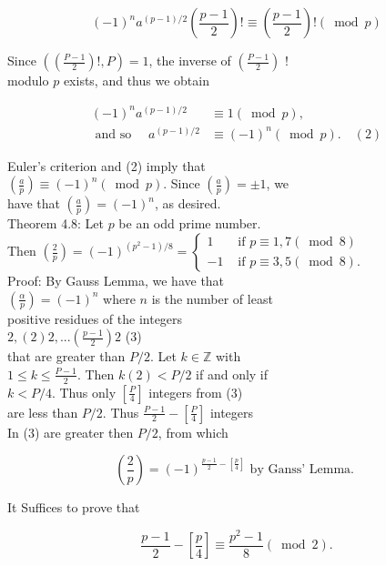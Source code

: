 \documentclass[10pt]{article}
\begin{document}
$$
(-1)^{n} a^{(p-1) / 2}\left(\frac{p-1}{2}\right)!\equiv\left(\frac{p-1}{2}\right)!(\bmod p)
$$

Since $\left(\left(\frac{P-1}{2}\right)!, P\right)=1$, the inverse of $\left(\frac{P-1}{2}\right)$ !\\
modulo $p$ exists, and thus we obtain

$$
\begin{aligned}
(-1)^{n} a^{(p-1) / 2} & \equiv 1(\bmod p), \\
\text { and so } \quad a^{(p-1) / 2} & \equiv(-1)^{n}(\bmod p) . \quad(2)
\end{aligned}
$$

Euler's criterion and (2) imply that\\
$\left(\frac{a}{p}\right) \equiv(-1)^{n}(\bmod p)$. Since $\left(\frac{a}{p}\right)= \pm 1$, we\\
have that $\left(\frac{a}{p}\right)=(-1)^{n}$, as desired.\\
Theorem 4.8: Let $p$ be an odd prime number.\\
Then $\left(\frac{2}{p}\right)=(-1)^{\left(p^{2}-1\right) / 8}=\left\{\begin{array}{cl}1 & \text { if } p \equiv 1,7(\bmod 8) \\ -1 & \text { if } p \equiv 3,5(\bmod 8) .\end{array}\right.$\\
Proof: By Gauss Lemma, we have that\\
$\left(\frac{\alpha}{p}\right)=(-1)^{n}$ where $n$ is the number of least\\
positive residues of the integers\\
$2,(2) 2, . . .\left(\frac{p-1}{2}\right) 2$ (3)\\
that are greater than $P / 2$. Let $k \in \mathbb{Z}$ with\\
$1 \leqslant k \leqslant \frac{P-1}{2}$. Then $k(2)<P / 2$ if and only if\\
$k<P / 4$. Thus only $\left[\frac{P}{4}\right]$ integers from (3)\\
are less than $P / 2$. Thus $\frac{P-1}{2}-\left[\frac{P}{4}\right]$ integers\\
In (3) are greater then $P / 2$, from which

$$
\left(\frac{2}{p}\right)=(-1)^{\frac{p-1}{2}-\left[\frac{p}{4}\right]} \text { by Ganss' Lemma. }
$$

It Suffices to prove that


\begin{equation*}
\frac{p-1}{2}-\left[\frac{p}{4}\right] \equiv \frac{p^{2}-1}{8}(\bmod 2) . \tag{4}
\end{equation*}
\end{document}
